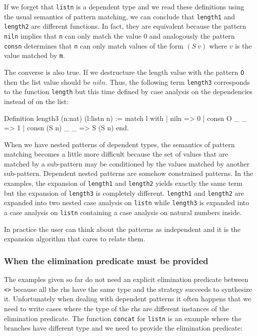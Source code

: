 If we forget that \verb+listn+ is a dependent type and we read these
definitions using the usual semantics of pattern matching,  we can conclude
that \verb+length1+
and \verb+length2+ are different functions.
In fact, they are equivalent
because the pattern \verb+niln+ implies that \verb+n+ can only match
the value $0$ and analogously the pattern \verb+consn+ determines that \verb+n+ can
only match  values of the form  $(S~v)$ where $v$ is the value matched by
\verb+m+. 


The converse is also true. If
we destructure the  length  value with the pattern \verb+O+ then the list
value should be $niln$. 
Thus, the following term \verb+length3+ corresponds to the function
\verb+length+ but this time defined by case analysis on the dependencies instead of on the list:

\begin{coq_example}
Definition length3 (n:nat) (l:listn n) :=
  match l with
  | niln => 0%
  | consn O _ _ => 1%
  | consn (S n) _ _ => S (S n)
  end.
\end{coq_example}

When we have nested patterns of dependent types, the semantics of
pattern matching becomes a little more difficult because
the set of values that are matched by a sub-pattern may be conditioned by the
values matched by another sub-pattern. Dependent nested patterns are
somehow constrained patterns. 
In the examples, the expansion of
\verb+length1+ and \verb+length2+ yields exactly the same term
 but the
expansion of \verb+length3+ is completely different. \verb+length1+ and
\verb+length2+ are expanded into two nested case analysis on
\verb+listn+ while \verb+length3+ is expanded into a case analysis on
\verb+listn+ containing a case analysis on natural numbers inside.


In practice the user can think about the patterns as independent and
it is the expansion algorithm that cares to relate them. \\


\subsubsection{When the elimination predicate must be provided}
The examples  given so far do not need an explicit elimination predicate
between \verb+<>+ because all the rhs have the same type and the
strategy succeeds to synthesize it.
Unfortunately when dealing with dependent patterns it often happens
that we need to write cases where the type of the rhs are 
different  instances of the elimination  predicate.
The function  \verb+concat+ for \verb+listn+
is an example where the branches have different type
and we need to provide the elimination predicate:

